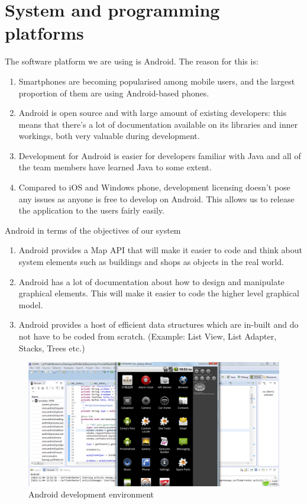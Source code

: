 \documentclass[10pt,a4paper,oneside]{report}
\begin{document}
\section*{System and programming platforms}
The software platform we are using is Android.  The reason for this is:
\begin{enumerate}
\item{Smartphones are becoming popularised among mobile users, and the largest proportion of them are using Android-based phones.}
\item{Android is open source and with large amount of existing developers: this means that there's a lot of documentation available on its libraries and inner workings, both very valuable during development.}
\item{Development for Android is easier for developers familiar with Java and all of the team members have learned Java to some extent.}
\item{Compared to iOS and Windows phone, development licensing doesn't pose any issues as anyone is free to develop on Android. This allows us to release the application to the users fairly easily.}
\end{enumerate}
Android in terms of the objectives of our system
\begin{enumerate}
\item{Android provides a Map API that will make it easier to code and think about system elements such as buildings and shops as objects in the real world.}
\item{Android has a lot of documentation about how to design and manipulate graphical elements. This will make it easier to code the higher level graphical model.}
\item{Android provides a host of efficient data structures which are in-built and do not have to be coded from scratch. (Example: List View, List Adapter, Stacks, Trees etc.)}
\end{enumerate}

\begin{figure}[H]
 \centering
 \includegraphics[keepaspectratio, width=\textwidth]{androiddev.png}
 \caption{Android development environment}
\end{figure}
\end{document}
